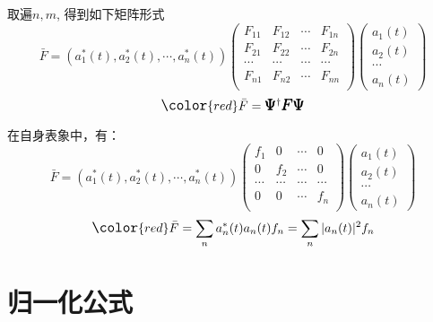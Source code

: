 \begin{frame} 
    取遍$n, m$, 得到如下矩阵形式\\
    $$\bar{F} =(a_1 ^*(t), a_2 ^*(t),\cdots,a_n^*(t) )
    \begin{pmatrix}
       F_{11} & F_{12} & \cdots & F_{1n} \\
       F_{21} & F_{22} & \cdots & F_{2n} \\
       \cdots & \cdots &  \cdots& \cdots\\
        F_{n1} & F_{n2} & \cdots & F_{nn} \\
    \end{pmatrix}
    \begin{pmatrix}
        a_1(t)\\
        a_2(t)\\
        \cdots \\
        a_n(t)
    \end{pmatrix}
    $$ \vspace{1.0em} 
    $$ \large \color{red} \bar{F} = \pmb {\Psi} ^{\dagger } \pmb {F} \pmb {\Psi} $$
\end{frame}

\begin{frame} 
    在自身表象中，有：
    $$\bar{F} =(a_1 ^*(t), a_2 ^*(t),\cdots,a_n^*(t) )
    \begin{pmatrix}
       f_1 & 0 & \cdots & 0 \\
       0& f_2 & \cdots & 0 \\
       \cdots & \cdots &  \cdots& \cdots\\
        0 & 0 & \cdots & f_n \\
    \end{pmatrix}
    \begin{pmatrix}
        a_1(t)\\
        a_2(t)\\
        \cdots \\
        a_n(t)
    \end{pmatrix}
    $$
    \vspace{1.0em} 
    $$ \large \color{red} \bar{F} = \sum_n a_n^*(t) a_n(t) f_n= \sum_n |a_n(t)|^2 f_n $$
\end{frame}

\section{归一化公式}

